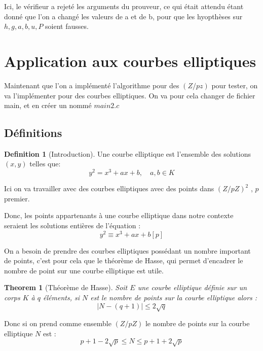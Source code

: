 \documentclass[a4paper]{article}
\theoremstyle{theorem}
\newtheorem{theorem}{Theorem}[section]
\theoremstyle{definition}
\newtheorem{definition}{Definition}[section]
\begin{document}
 Ici, le vérifieur a rejeté les arguments du prouveur, ce qui était attendu étant donné que l'on a changé les valeurs de a et de b, pour que les hyopthèses sur $h,g,a,b,u,P$ soient fausses.   
 
 \section{Application aux courbes elliptiques}
 
 Maintenant que l'on a implémenté l'algorithme pour des $(Z/pz)$ pour tester, on va l'implémenter pour des courbes elliptiques.
 On va pour cela changer de fichier main, et en créer un nommé $main2.c$
 
 \subsection{Définitions}
\begin{definition}[Introduction]
	

	  	
	 Une courbe elliptique est l'ensemble des solutions $(x,y)$ telles que:
	 \[y^{2} = x^{3}+ax+b,\quad a,b \in K \]
	 
Ici on va travailler avec des courbes elliptiques avec des points dans $(Z/pZ)^{2}$ , $p$ premier.

Donc, les points appartenants à une courbe elliptique dans notre contexte seraient les solutions entières de l'équation : 
\[y^{2} \equiv x^{3}+ax+b \left[ p\right] \]
	
	

	
\end{definition}
 
 On a besoin de prendre des courbes elliptiques possédant un nombre important de points, c'est pour cela que le théorème de Hasse, qui permet d'encadrer le nombre de point sur une courbe elliptique est utile.
 
 
 
 \begin{theorem}[Théorème de Hasse]
 	Soit $E$ une courbe elliptique définie sur un corps $K$ à $q$ éléments, si $N$ est le nombre de points sur la courbe elliptique alors :
 	\[   |N -(q+1) | \leqslant 2\sqrt{q} \]
 \end{theorem}
 
 
 
Donc si on prend comme ensemble $(Z/pZ)$ le nombre de points sur la courbe elliptique $N $ est :
\[  p+1 - 2\sqrt{p} \leq N \leq p+1 + 2\sqrt{p}\]
\end{document}
